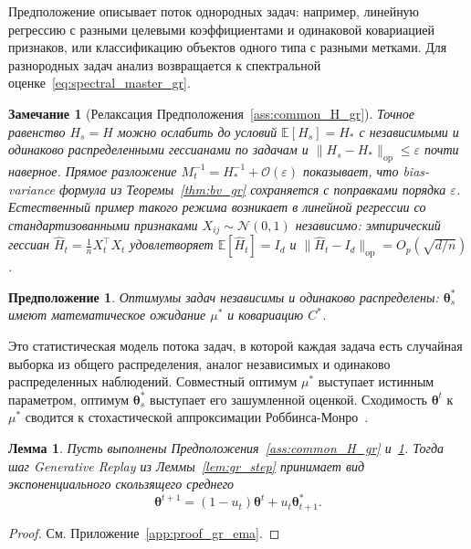\documentclass[a4paper,14pt,oneside,openany]{extarticle}
\newtheorem{lemma}{Лемма}
\newtheorem{assumption}{Предположение}
\newtheorem*{note}{Замечание}
\newcommand{\cN}{\mathcal{N}}
\newcommand{\bbE}{\mathbb{E}}
\newcommand{\btheta}{\boldsymbol{\theta}}
\begin{document}
Предположение описывает поток однородных задач: например, линейную регрессию с разными целевыми коэффициентами и одинаковой ковариацией признаков, или классификацию объектов одного типа с разными метками. Для разнородных задач анализ возвращается к спектральной оценке~\eqref{eq:spectral_master_gr}.

\begin{note}[Релаксация Предположения~\ref{ass:common_H_gr}]
Точное равенство $H_s = H$ можно ослабить до условий $\bbE[H_s] = H_*$ с независимыми и одинаково распределенными гессианами по задачам и $\|H_s - H_*\|_{\mathrm{op}} \le \varepsilon$ почти наверное. Прямое разложение $M_t^{-1} = H_*^{-1} + \mathcal{O}(\varepsilon)$ показывает, что bias-variance формула из Теоремы~\ref{thm:bv_gr} сохраняется с поправками порядка $\varepsilon$. Естественный пример такого режима возникает в линейной регрессии со стандартизованными признаками $X_{ij} \sim \cN(0, 1)$ независимо: эмпирический гессиан $\hat H_t = \tfrac{1}{n}X_t^\top X_t$ удовлетворяет $\bbE[\hat H_t] = I_d$ и $\|\hat H_t - I_d\|_{\mathrm{op}} = O_p(\sqrt{d/n})$.
\end{note}

\begin{assumption}\label{ass:iid_targets_gr}
    Оптимумы задач независимы и одинаково распределены: $\btheta^*_s$ имеют математическое ожидание $\mu^*$ и ковариацию $C^*$.
\end{assumption}

Это статистическая модель потока задач, в которой каждая задача есть случайная выборка из общего распределения, аналог независимых и одинаково распределенных наблюдений. Совместный оптимум $\mu^*$ выступает истинным параметром, оптимум $\btheta^*_s$ выступает его зашумленной оценкой. Сходимость $\btheta^t$ к $\mu^*$ сводится к стохастической аппроксимации Роббинса-Монро~\cite{robbins1951stochastic}.

\begin{lemma}\label{lem:gr_ema}
    Пусть выполнены Предположения~\ref{ass:common_H_gr} и~\ref{ass:iid_targets_gr}. Тогда шаг Generative Replay из Леммы~\ref{lem:gr_step} принимает вид экспоненциального скользящего среднего
    \begin{equation}
        \btheta^{t+1} = (1 - u_t)\btheta^t + u_t \btheta^*_{t+1}.
        \label{eq:ema_gr}
    \end{equation}
\end{lemma}

\begin{proof}См. Приложение~\ref{app:proof_gr_ema}.\end{proof}
\end{document}
